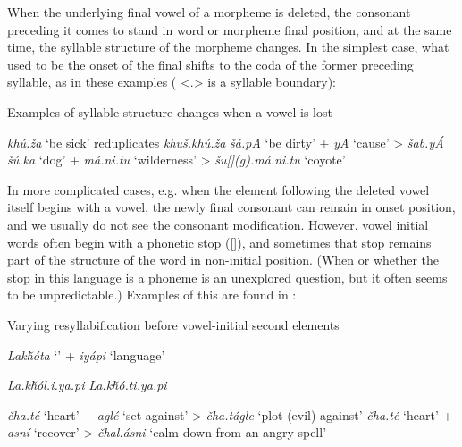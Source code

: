 \documentclass[output=paper]{LSP/langsci}
\begin{document}
When the underlying final vowel of a morpheme is deleted, the consonant preceding it comes to stand in word or morpheme final position, and at the same time, the syllable structure of the morpheme changes. In the simplest case, what used to be the onset of the final shifts to the coda of the former preceding syllable, as in these examples ( <.> is a syllable boundary):

\begin{exe}
\ex\label{ex:rood:12} Examples of syllable structure changes when a vowel is lost
\begin{xlist}
\ex \textit{khú.\v{z}a} `be sick' reduplicates \textit{khu\v{s}.khú.\v{z}a}
\ex \textit{\v{s}á.pA} `be dirty' + \textit{yA} `cause' > \textit{\v{s}ab.yÁ}
\ex \textit{\v{s}ú.ka} `dog' + \textit{má.ni.tu} `wilderness' > \textit{\v{s}u[](g).má.ni.tu} `coyote'
\end{xlist}
\end{exe}

In more complicated cases, e.g. when the element following the deleted vowel itself begins with a vowel, the newly final consonant can remain in onset position, and we usually do not see the consonant modification. However, vowel initial words often begin with a phonetic  stop ([]), and sometimes that  stop remains part of the structure of the word in non-initial position. (When or whether the  stop in this language is a phoneme is an unexplored question, but it often seems to be unpredictable.) Examples of this are found in :

\begin{exe}
\ex \label{ex:rood:13}Varying resyllabification before vowel-initial second elements
\begin{xlist}
\ex \textit{Lak\v{h}\'ota} `' + \textit{iyápi} `language'
\begin{xlist}
  \ex \textit{La.k\v{h}\'ol.i.ya.pi}
\ex \textit{La.k\v{h}\'o.ti.ya.pi}
\end{xlist}
\ex 
\begin{xlist}
\ex \textit{\v{c}ha.té} `heart' + \textit{aglé} `set against' > \textit{\v{c}ha.tágle} `plot (evil) against'
\ex \textit{\v{c}ha.té} `heart' + \textit{asní} `recover' > \textit{\v{c}hal.ásni} `calm down from an angry spell'
\end{xlist}
\end{xlist}
\end{exe}
\end{document}
